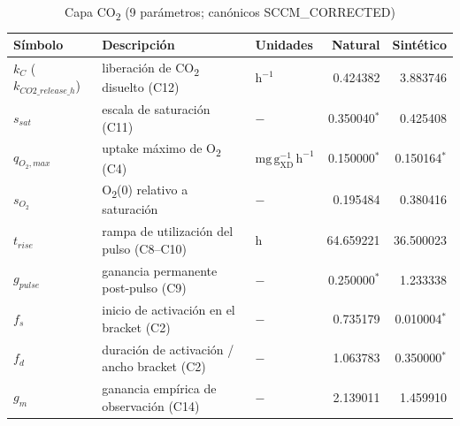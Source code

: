\documentclass[11pt,a4paper]{article}
\begin{document}
\begin{small}
\begin{longtable}{@{}l p{5.6cm} p{3.2cm} r r@{}}
\caption{Capa CO\textsubscript{2} (9 parámetros; canónicos SCCM\_CORRECTED)}\\
\toprule
Símbolo & Descripción & Unidades & Natural & Sintético \\
\midrule
\endhead
$k_C$ ($k_{CO2\_release\_h}$) & liberación de CO\textsubscript{2} disuelto (C12) & $\mathrm{h^{-1}}$ & 0.424382 & 3.883746 \\
$s_{sat}$ & escala de saturación (C11) & $-$ & 0.350040$^{*}$ & 0.425408 \\
$q_{O_2,max}$ & uptake máximo de O\textsubscript{2} (C4) & $\mathrm{mg\,g_{XD}^{-1}\,h^{-1}}$ & 0.150000$^{*}$ & 0.150164$^{*}$ \\
$s_{O_2}$ & O\textsubscript{2}(0) relativo a saturación & $-$ & 0.195484 & 0.380416 \\
$t_{rise}$ & rampa de utilización del pulso (C8--C10) & $\mathrm{h}$ & 64.659221 & 36.500023 \\
$g_{pulse}$ & ganancia permanente post-pulso (C9) & $-$ & 0.250000$^{*}$ & 1.233338 \\
$f_s$ & inicio de activación en el bracket (C2) & $-$ & 0.735179 & 0.010004$^{*}$ \\
$f_d$ & duración de activación / ancho bracket (C2) & $-$ & 1.063783 & 0.350000$^{*}$ \\
$g_m$ & ganancia empírica de observación (C14) & $-$ & 2.139011 & 1.459910 \\
\bottomrule
\end{longtable}


\end{small}
\end{document}
